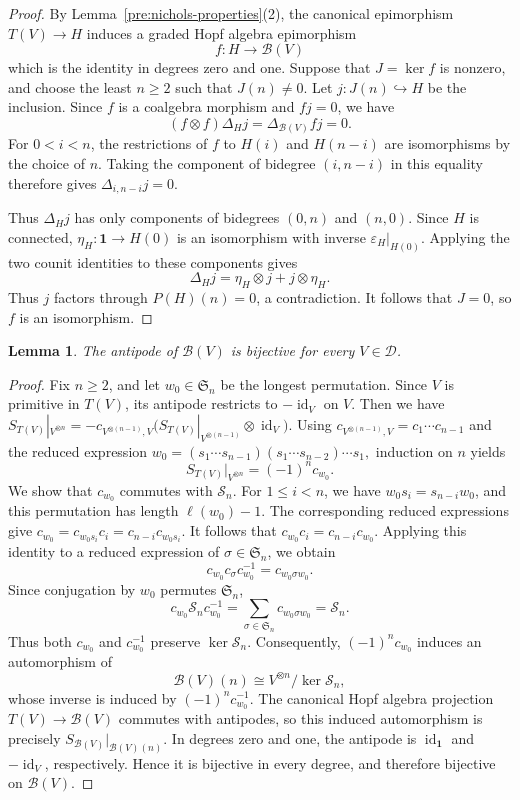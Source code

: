 \documentclass[11pt, a4paper]{article}
\numberwithin{equation}{section}
\newcommand{\D}{\mathcal D}
\newcommand{\B}{\mathcal B}
\newcommand{\one}{\mathbf 1}
\DeclareMathOperator{\id}{id}
\newtheorem{lemma}[theorem]{Lemma}
\begin{document}
\begin{proof}
By Lemma~\ref{pre:nichols-properties}(2), the canonical epimorphism
$T(V)\to H$ induces a graded Hopf algebra epimorphism
\[
 f:H\longrightarrow\B(V)
\]
which is the identity in degrees zero and one.
Suppose that $J=\ker f$ is nonzero, and choose the least $n\geq2$
such that $J(n)\neq0$. Let $j:J(n)\hookrightarrow H$ be the inclusion.
Since $f$ is a coalgebra morphism and $fj=0$, we have
\[
 (f\otimes f)\Delta_Hj=\Delta_{\B(V)}fj=0.
\]
For $0<i<n$, the restrictions of $f$ to $H(i)$ and $H(n-i)$
are isomorphisms by the choice of $n$. Taking the component of
bidegree $(i,n-i)$ in this equality therefore gives
$\Delta_{i,n-i}j=0$.


Thus $\Delta_Hj$ has only components of bidegrees $(0,n)$ and
$(n,0)$. Since $H$ is connected, $\eta_H:\one\to H(0)$ is an
isomorphism with {inverse} $\varepsilon_H|_{H(0)}$.
Applying the two counit identities to these components gives
\[
 \Delta_Hj=\eta_H\otimes j+j\otimes\eta_H.
\]
Thus $j$ factors through $P(H)(n)=0$, a contradiction.
It follows that $J=0$, so $f$ is an isomorphism.
\end{proof}

\begin{lemma}\label{pre:nichols-antipode}
The antipode of $\B(V)$ is bijective for every $V\in\D$.
\end{lemma}

\begin{proof}
Fix $n\geq2$, and let $w_0\in\mathfrak S_n$ be the longest
permutation. Since $V$ is primitive in $T(V)$, its antipode
restricts to $-\id_V$ on $V$.
Then we have 
$
 S_{T(V)}|_{V^{\otimes n}}
 =-c_{V^{\otimes(n-1)},V}
   \bigl(S_{T(V)}|_{V^{\otimes(n-1)}}\otimes\id_V\bigr).
$
Using $c_{V^{\otimes(n-1)},V}=c_1\cdots c_{n-1}$ and the
reduced expression
$
 w_0=(s_1\cdots s_{n-1})(s_1\cdots s_{n-2})\cdots s_1,
$
induction on $n$ yields
\[
 S_{T(V)}|_{V^{\otimes n}}=(-1)^n c_{w_0}.
\]
We show that $c_{w_0}$ commutes with $\mathcal S_n$.
For $1\leq i<n$, we have
$w_0s_i=s_{n-i}w_0$, and this permutation has length
$\ell(w_0)-1$. The corresponding reduced expressions give
$
 c_{w_0}
 =c_{w_0s_i}c_i
 =c_{n-i}c_{w_0s_i}.
$
It follows that $c_{w_0}c_i=c_{n-i}c_{w_0}$.
Applying this identity to a reduced expression of
$\sigma\in\mathfrak S_n$, we obtain
\[
 c_{w_0}c_\sigma c_{w_0}^{-1}=c_{w_0\sigma w_0}.
\]
Since conjugation by $w_0$ permutes $\mathfrak S_n$,
\[
 c_{w_0}\mathcal S_n c_{w_0}^{-1}
 =\sum_{\sigma\in\mathfrak S_n}c_{w_0\sigma w_0}
 =\mathcal S_n.
\]
Thus both $c_{w_0}$ and $c_{w_0}^{-1}$ preserve
$\ker\mathcal S_n$. Consequently, $(-1)^n c_{w_0}$ induces
an automorphism of
\[
 \B(V)(n)\cong V^{\otimes n}/\ker\mathcal S_n,
\]
whose inverse is induced by $(-1)^n c_{w_0}^{-1}$.
The canonical Hopf algebra projection $T(V)\to\B(V)$ commutes
with antipodes, so this induced automorphism is precisely
$S_{\B(V)}|_{\B(V)(n)}$.
In degrees zero and one, the antipode is $\id_{\one}$ and
$-\id_V$, respectively. Hence it is bijective in every degree,
and therefore bijective on $\B(V)$.
\end{proof}
\end{document}
